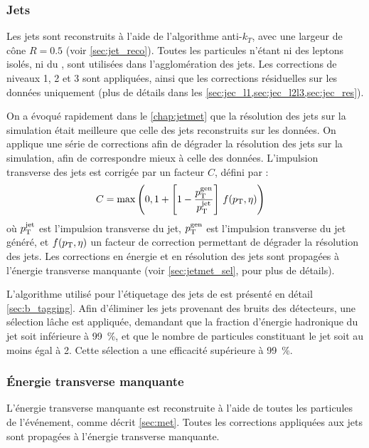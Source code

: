 \subsubsection{Jets}

Les jets sont reconstruits à l'aide de l'algorithme anti-$k_T$, avec une largeur de cône $R = \num{0.5}$ (voir \cref{sec:jet_reco}). Toutes les particules \pf n'étant ni des leptons isolés, ni du \pu, sont utilisées dans l'agglomération des jets. Les corrections de niveaux 1, 2 et 3 sont appliquées, ainsi que les corrections résiduelles sur les données uniquement (plus de détails dans les \cref{sec:jec_l1,sec:jec_l2l3,sec:jec_res}).

On a évoqué rapidement dans le \cref{chap:jetmet} que la résolution des jets sur la simulation était meilleure que celle des jets reconstruits sur les données. On applique une série de corrections afin de dégrader la résolution des jets sur la simulation, afin de correspondre mieux à celle des données. L'impulsion transverse des jets est corrigée par un facteur $C$, défini par :
\begin{align*}
  C &= \max\left(0, 1 + \left[ 1 - \frac{p_{\mathrm{T}}^\text{gen}}{p_{\mathrm{T}}^\text{jet}} \right] \, f(p_{\mathrm{T}}, \eta)\right)
\end{align*}
où $p_{\mathrm{T}}^\text{jet}$ est l'impulsion transverse du jet, $p_{\mathrm{T}}^\text{gen}$ est l'impulsion transverse du jet généré, et $f(p_{\mathrm{T}}, \eta)$ un facteur de correction permettant de dégrader la résolution des jets. Les corrections en énergie et en résolution des jets sont propagées à l'énergie transverse manquante (voir \cref{sec:jetmet_sel},  pour plus de détails).

L'algorithme utilisé pour l'étiquetage des jets de \Pbottom est présenté en détail \cref{sec:b_tagging}. Afin d'éliminer les jets provenant des bruits des détecteurs, une sélection lâche est appliquée, demandant que la fraction d'énergie hadronique du jet soit inférieure à \SI{99}{\percent}, et que le nombre de particules constituant le jet soit au moins égal à 2. Cette sélection a une efficacité supérieure à \SI{99}{\%}.

\subsubsection{Énergie transverse manquante}

L'énergie transverse manquante est reconstruite à l'aide de toutes les particules \pf de l'événement, comme décrit \cref{sec:met}. Toutes les corrections appliquées aux jets sont propagées à l'énergie transverse manquante.


